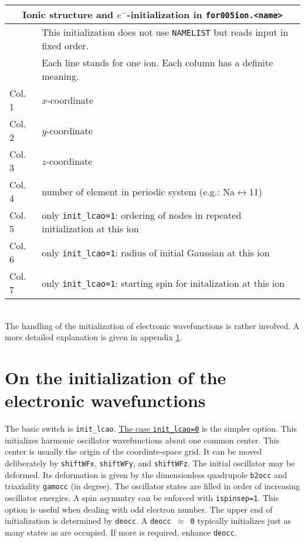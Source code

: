 \documentclass[12pt]{article}
\begin{document}
\begin{tabular}{ll}
\hline
\multicolumn{2}{c}{Ionic structure and $e^-$-initialization in {\tt for005ion.<name>}} \\
\hline
& This initialization does not use {\tt NAMELIST} but reads
 input in fixed order.\\
& Each line stands for one ion. Each column has a definite meaning.\\
Col. 1 &  $x$-coordinate \\
Col. 2 &  $y$-coordinate \\
Col. 3 &  $z$-coordinate \\
Col. 4 & 
   number of element in periodic system (e.g.: Na$\leftrightarrow$11)\\
Col. 5 & only {\tt init\_lcao=1}: ordering of nodes in repeated
    initialization at this ion\\
Col. 6 & only {\tt init\_lcao=1}: radius of initial Gaussian at 
    this ion\\
Col. 7 & only {\tt init\_lcao=1}: starting spin for initalization at
    this ion\\
\hline
\end{tabular}
\\[8pt]
The handling of the initialization of electronic wavefunctions is
rather involved. A more detailed explanation is given in appendix
\ref{sec:inite}.

\newpage

\appendix

\section{On the initialization of the electronic wavefunctions}
\label{sec:inite}

The basic switch is {\tt init\_lcao}. \underline{The case
{\tt init\_lcao=0}} is the simpler option. This initializes harmonic
oscillator wavefunctions about one common center. This center is
usually the origin of the coordinte-space grid. It can be moved
deliberately by {\tt shiftWFx}, {\tt shiftWFy}, and {\tt shiftWFz}.
The initial oscillator may be deformed. Its deformation is given by
the dimensionless quadrupole {\tt b2occ} and triaxiality {\tt gamocc}
(in degree). The oscillator states are filled in order of
increasing oscillator energies. A spin asymmtry can be enforced
with {\tt ispinsep=1}. This option is useful when dealing with odd
electron number. The upper end of initialization is determined by
{\tt deocc}. A {\tt deocc $\approx$ 0} typically initializes just as many
states as are occupied. If more is required, enhance {\tt deocc}.
\end{document}
